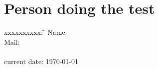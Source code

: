 \section{Person doing the test}
\begin{tabbing}
xxxxxxxxxx: \= \kill  %
Name:           \> 
\TextField[name=name,width=5cm,charsize=12pt]
{\mbox{}} 
\\
Mail:  \> \TextField[name=vor,width=5cm,charsize=12pt]
{\mbox{}} \\
\\
current date: \> \today

\end{tabbing}